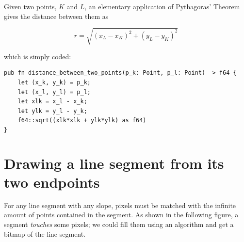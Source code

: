 \documentclass[12pt,a4,oneside,usenames,dvipsnames]{book}
\newcommand\bitmap{{\pixel{}bitmap}}
\begin{document}
Given two points, $K$ and $L$, an elementary application of Pythagoras' Theorem gives the distance between them as

\begin{equation}
  r = \sqrt{(x_{L} - x_{K})^{2} +(y_{L} - y_{K})^{2}}
\end{equation}

which is simply coded:

\begin{verbatim}
pub fn distance_between_two_points(p_k: Point, p_l: Point) -> f64 {
    let (x_k, y_k) = p_k;
    let (x_l, y_l) = p_l;
    let xlk = x_l - x_k;
    let ylk = y_l - y_k;
    f64::sqrt((xlk*xlk + ylk*ylk) as f64)
}
\end{verbatim}

\section{Drawing a line segment from its two endpoints}

For any line segment with any slope, pixels must be matched with the infinite
amount of points contained in the segment. As shown in the following figure, a segment \emph{touches} some pixels; we could fill them using an algorithm and get a \bitmap{} of the line segment.

\begin{center}

\end{center}
\end{document}
